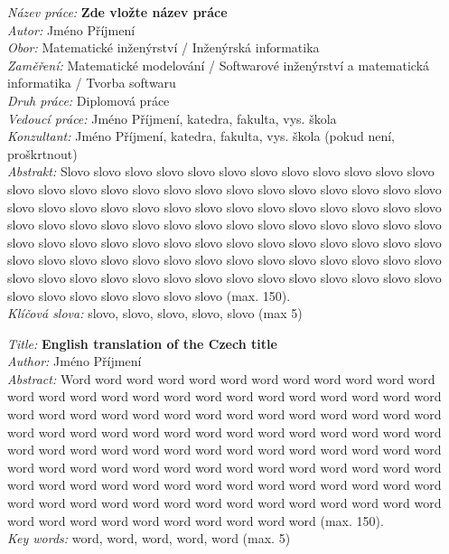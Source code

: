 {
\setlength{\parindent}{0pt}

\textit{Název práce:}
\textbf{Zde vložte název práce} \\

\textit{Autor:} Jméno Příjmení \\

\textit{Obor:} Matematické inženýrství / Inženýrská informatika \\

\textit{Zaměření:} Matematické modelování / Softwarové inženýrství a matematická 
informatika / Tvorba softwaru \\

\textit{Druh práce:} Diplomová práce \\

\textit{Vedoucí práce:}  Jméno Příjmení, katedra, fakulta, vys. škola \\

\textit{Konzultant:}  Jméno Příjmení, katedra, fakulta, vys. škola (pokud není, 
proškrtnout) \\

\textit{Abstrakt:} 
Slovo slovo slovo slovo slovo slovo slovo slovo slovo slovo slovo slovo slovo 
slovo
slovo slovo slovo slovo slovo slovo slovo slovo slovo slovo slovo slovo slovo 
slovo
slovo slovo slovo slovo slovo slovo slovo slovo slovo slovo slovo slovo slovo 
slovo
slovo slovo slovo slovo slovo slovo slovo slovo slovo slovo slovo slovo slovo 
slovo
slovo slovo slovo slovo slovo slovo slovo slovo slovo slovo slovo slovo slovo 
slovo
slovo slovo slovo slovo slovo slovo slovo slovo slovo slovo slovo slovo slovo 
slovo
slovo slovo slovo slovo slovo slovo slovo slovo slovo slovo slovo slovo slovo 
slovo
slovo slovo slovo slovo slovo (max. 150).\\

\textit{Klíčová slova:}  slovo, slovo, slovo, slovo, slovo (max 5)

\vspace{1.5cm}

\textit{Title:}
\textbf{English translation of the Czech title} \\

\textit{Author:} Jméno Příjmení\\

\textit{Abstract:} 
Word word word word word word word word word word word word
word word word word word word word word word word word word
word word word word word word word word word word word word
word word word word word word word word word word word word
word word word word word word word word word word word word
word word word word word word word word word word word word
word word word word word word word word word word word word
word word word word word word word word word word word word
word word word word word word word word word word word word
word word word word word word word word word word word word
(max. 150). \\

\textit{Key words:}  word, word, word, word, word (max. 5)
}

